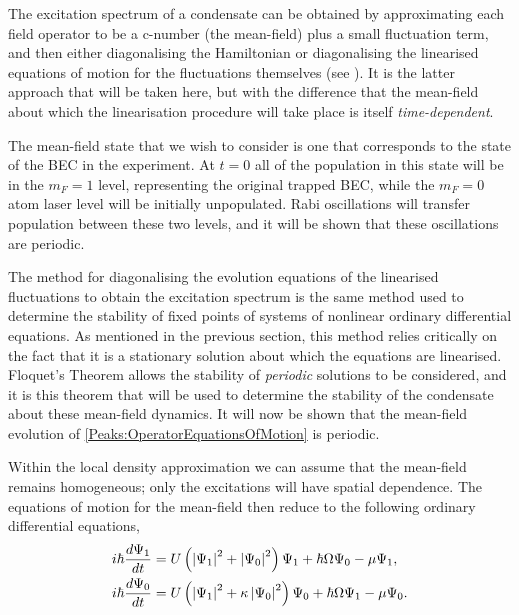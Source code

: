 The excitation spectrum of a condensate can be obtained by approximating each field operator to be a c-number (the mean-field) plus a small fluctuation term, and then either diagonalising the Hamiltonian \cite{Bogoliubov:1947,FetterWalecka} or diagonalising the linearised equations of motion for the fluctuations themselves (see ). It is the latter approach that will be taken here, but with the difference that the mean-field about which the linearisation procedure will take place is itself \emph{time-dependent}.

The mean-field state that we wish to consider is one that corresponds to the state of the BEC in the experiment. At $t=0$ all of the population in this state will be in the $m_F=1$ level, representing the original trapped BEC, while the $m_F=0$ atom laser level will be initially unpopulated. Rabi oscillations will transfer population between these two levels, and it will be shown that these oscillations are periodic.

The method for diagonalising the evolution equations of the linearised fluctuations to obtain the excitation spectrum is the same method used to determine the stability of fixed points of systems of nonlinear ordinary differential equations. As mentioned in the previous section, this method relies critically on the fact that it is a stationary solution about which the equations are linearised. Floquet's Theorem \citep{Nayfeh:1995} allows the stability of \emph{periodic} solutions to be considered, and it is this theorem that will be used to determine the stability of the condensate about these mean-field dynamics. It will now be shown that the mean-field evolution of \eqref{Peaks:OperatorEquationsOfMotion} is periodic.

Within the local density approximation we can assume that the mean-field remains homogeneous; only the excitations will have spatial dependence. The equations of motion for the mean-field then reduce to the following ordinary differential equations,
\begin{subequations}
    \label{Peaks:MeanFieldEquationsOfMotion}
    \begin{align}
    i \hbar \frac{d \Psi_1}{dt} &= U\left(\abs{\Psi_1}^2 + \abs{\Psi_0}^2\right)\Psi_1 + \hbar \Omega \Psi_0 - \mu \Psi_1,\\
    i \hbar \frac{d \Psi_0}{dt} &= U\left(\abs{\Psi_1}^2 + \kappa \abs{\Psi_0}^2\right)\Psi_0 + \hbar \Omega \Psi_1 - \mu \Psi_0.
    \end{align}
\end{subequations}

